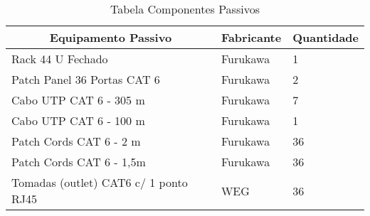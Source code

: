 \begin{table}[h!]
	\centering
	\begin{tabular}{|l|l|l|}
		\hline
		\multicolumn{1}{|c|}{\textbf{Equipamento Passivo}} & \multicolumn{1}{c|}{\textbf{Fabricante}} & \multicolumn{1}{c|}{\textbf{Quantidade}} \\ \hline
		Rack 44 U Fechado                                  & Furukawa                                 & 1                                        \\ \hline
		Patch Panel 36 Portas CAT 6                        & Furukawa                                 & 2                                        \\ \hline
		Cabo UTP CAT 6 - 305 m                             & Furukawa                                 & 7                                        \\ \hline
		Cabo UTP CAT 6 - 100 m                             & Furukawa                                 & 1                                        \\ \hline
		Patch Cords CAT 6 - 2 m                            & Furukawa                                 & 36                                       \\ \hline
		Patch Cords CAT 6 - 1,5m                              & Furukawa                                 & 36                                       \\ \hline
		Tomadas (outlet) CAT6 c/ 1 ponto RJ45              & WEG                                      & 36                                       \\ \hline
	\end{tabular}
	\caption{Tabela Componentes Passivos}
	\label{tab:passivos}
\end{table}



